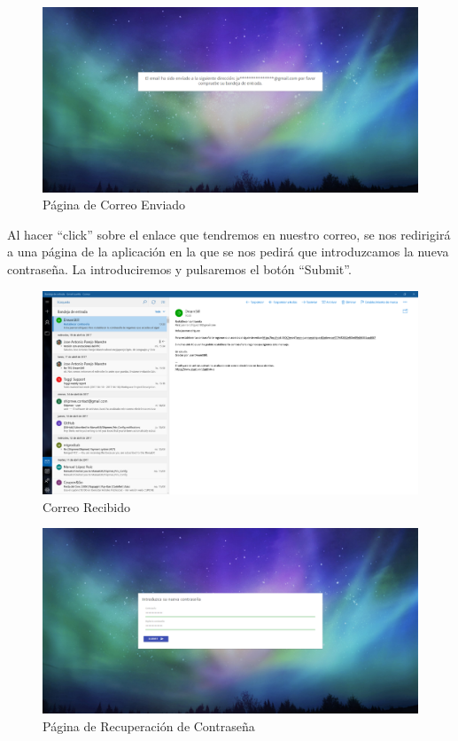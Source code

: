 \documentclass[11pt,openany]{book}
\begin{document}
\begin{figure}[H]
\centering
\includegraphics[totalheight=6cm]{manualUsuario/correoEnviado.png}
\caption{Página de Correo Enviado}
\end{figure}

\pagebreak
Al hacer ``click'' sobre el enlace que tendremos en nuestro correo, se nos redirigirá a una página de la aplicación en la que se nos pedirá que introduzcamos la nueva contraseña. La introduciremos y pulsaremos el botón ``Submit''. 

\begin{figure}[H]
\centering
\includegraphics[totalheight=6cm]{manualUsuario/correoRecibido.png}
\caption{Correo Recibido}
\end{figure}

\begin{figure}[H]
\centering
\includegraphics[totalheight=6cm]{manualUsuario/contrase_aRecuperacion.png}
\caption{Página de Recuperación de Contraseña}
\end{figure}
\end{document}

